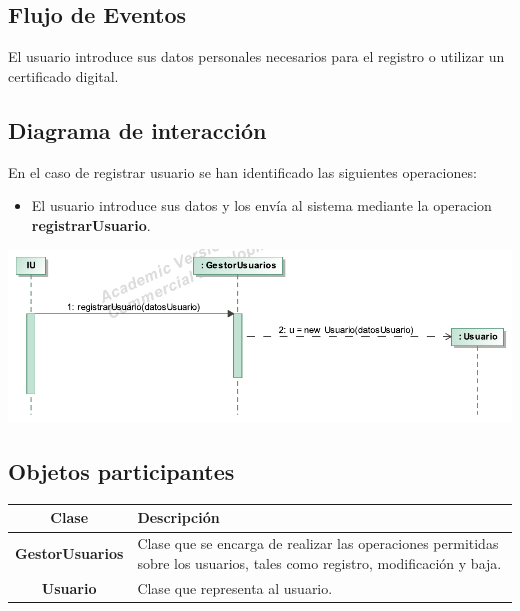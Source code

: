 \documentclass[12pt, a4paper, titlepage]{article}
\begin{document}
\subsection{Flujo de Eventos}
El usuario introduce sus datos personales necesarios para el registro o utilizar un certificado digital.

\subsection{Diagrama de interacción}

En el caso de {\sc registrar usuario } se han identificado las siguientes operaciones:

\begin{itemize}
	\item El usuario introduce sus datos y los envía al sistema mediante la operacion \textbf{registrarUsuario}.
\end{itemize}

\begin{center}
	\includegraphics{Imagenes/OperacionRegistrarUsuario.pdf}
\end{center}

\subsection{Objetos participantes}

\begin{center}

\begin{tabular}{|c|p{14cm}|}
	\hline
	\textbf{Clase} & \textbf{Descripción}\\ \hline
	\textbf{GestorUsuarios} &  Clase que se encarga de realizar las operaciones permitidas sobre los usuarios, tales como registro, modificación y baja.\\ \hline
	\textbf{Usuario} & Clase que representa al usuario. \\ \hline
\end{tabular}

\end{center}
\end{document}
